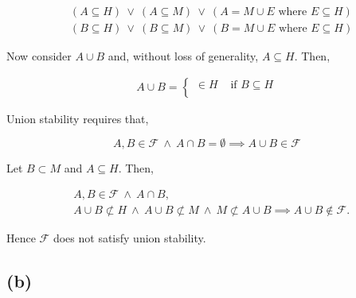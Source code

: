 \documentclass[american]{scrartcl}
\begin{document}
    \begin{equation}
        \begin{split}
            &(A \subseteq H) \ \lor \ (A \subseteq M) \ \lor \ (A = M \cup E \text{ where } E \subseteq H) \\
            &(B \subseteq H) \ \lor \ (B \subseteq M) \ \lor \ (B = M \cup E \text{ where } E \subseteq H)
        \end{split}
    \end{equation}

    Now consider $A \cup B$ and, without loss of generality, $A \subseteq H$. Then,

    \begin{equation}
        \begin{split}
            A \cup B = \begin{cases}
                \in H & \text{ if } B \subseteq H \\
            \end{cases}
        \end{split}
    \end{equation}

\fi

Union stability requires that,

\begin{equation}
    A, B \in \mathcal{F} \ \land \ A \cap B = \emptyset \implies A \cup B \in \mathcal{F}
\end{equation}

Let $B \subset M$ and $A \subseteq H$. Then,

\begin{equation}
    \begin{split}
        &A, B \in \mathcal{F} \ \land \ A \cap B, \\
        &A \cup B \not\subset H \ \land \ A \cup B \not\subset M \ \land \ M \not\subset A \cup B \implies A \cup B \notin \mathcal{F}.
    \end{split}
\end{equation}

Hence $\mathcal{F}$ does not satisfy union stability.


\subsection*{(b)}
\end{document}
